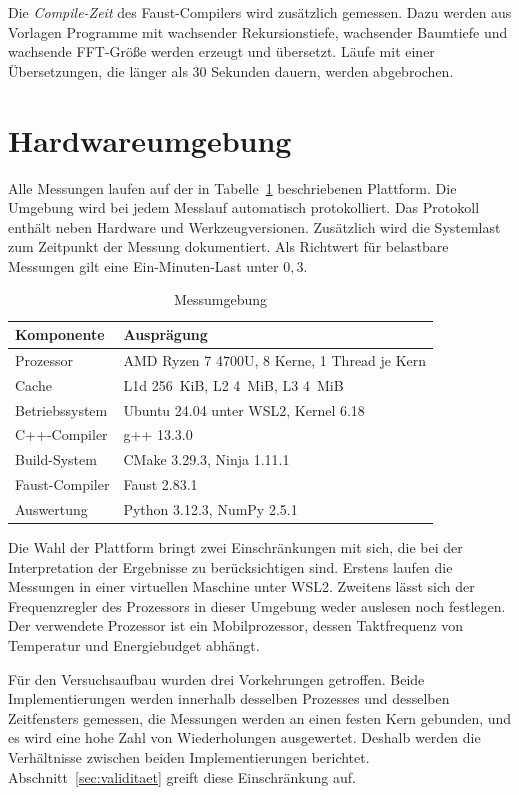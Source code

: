 Die \emph{Compile-Zeit} des Faust-Compilers wird zusätzlich gemessen. Dazu
werden aus Vorlagen Programme mit wachsender Rekursionstiefe, wachsender
Baumtiefe und wachsende FFT-Größe werden erzeugt und übersetzt. Läufe mit einer
Übersetzungen, die länger als 30 Sekunden dauern, werden abgebrochen.

\section{Hardwareumgebung}
\label{sec:hardware}

Alle Messungen laufen auf der in Tabelle~\ref{tab:umgebung} beschriebenen
Plattform. Die Umgebung wird bei jedem Messlauf automatisch protokolliert. Das
Protokoll enthält neben Hardware und Werkzeugversionen. Zusätzlich wird die Systemlast zum Zeitpunkt der Messung dokumentiert. Als Richtwert für belastbare Messungen gilt eine Ein-Minuten-Last unter $0{,}3$.

\begin{table}[htb]
	\centering
	\small
	\caption{Messumgebung}
	\label{tab:umgebung}
	\begin{tabular}{@{}ll@{}}
		\toprule
		\textbf{Komponente} & \textbf{Ausprägung} \\
		\midrule
		Prozessor       & AMD Ryzen 7 4700U, 8 Kerne, 1 Thread je Kern \\
		Cache           & L1d 256~KiB, L2 4~MiB, L3 4~MiB \\
		Betriebssystem  & Ubuntu 24.04 unter WSL2, Kernel 6.18 \\
		C++-Compiler    & g++ 13.3.0 \\
		Build-System    & CMake 3.29.3, Ninja 1.11.1 \\
		Faust-Compiler  & Faust 2.83.1 \\
		Auswertung      & Python 3.12.3, NumPy 2.5.1 \\
		\bottomrule
	\end{tabular}
\end{table}

Die Wahl der Plattform bringt zwei Einschränkungen mit sich, die bei der
Interpretation der Ergebnisse zu berücksichtigen sind. Erstens laufen die
Messungen in einer virtuellen Maschine unter WSL2. Zweitens lässt sich der Frequenzregler des Prozessors in dieser Umgebung weder auslesen noch festlegen. Der verwendete Prozessor ist ein Mobilprozessor, dessen Taktfrequenz von Temperatur und
Energiebudget abhängt.

Für den Versuchsaufbau wurden drei Vorkehrungen getroffen. Beide Implementierungen werden
innerhalb desselben Prozesses und desselben Zeitfensters gemessen, die
Messungen werden an einen festen Kern gebunden, und es wird eine hohe Zahl von
Wiederholungen ausgewertet. Deshalb werden die Verhältnisse zwischen
beiden Implementierungen berichtet. Abschnitt~\ref{sec:validitaet} greift diese Einschränkung auf.

